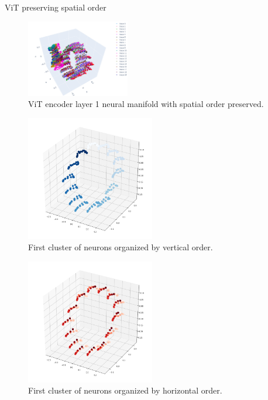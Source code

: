 \documentclass[xcolor={dvipsnames,svgnames}]{beamer}
\begin{document}
\begin{frame}{ViT preserving spatial order}
\begin{figure}
            \includegraphics[width=0.4\textwidth]{presentation/embeddings/vit-3d-layer1.png}
            \caption{ViT encoder layer 1 neural manifold with spatial order preserved.}
        \end{figure} 
    \begin{minipage}[t]{.45\linewidth}  
    \begin{figure}
            \includegraphics[width=0.5\textwidth]{presentation/embeddings/vit-spatial1.png}
            \caption{First cluster of neurons organized by vertical order.}
        \end{figure} 
    \end{minipage}
      \begin{minipage}[t]{.45\linewidth}   
      \begin{figure}         \includegraphics[width=0.5\textwidth]{presentation/embeddings/vit-spatial2.png}
      \caption{First cluster of neurons organized by horizontal order.}
            \end{figure} 
    \end{minipage}
\end{frame}
\end{document}
